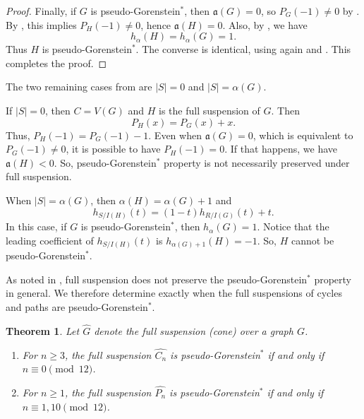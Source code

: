 \documentclass[12pt]{amsart}
\theoremstyle{plain}
\newtheorem{thm}{Theorem}[section]
\theoremstyle{definition}
\begin{document}
\begin{proof}
Finally, if \(G\) is pseudo-Gorenstein\(^{*}\), then \(\mathfrak a(G)=0\), so
\(P_G(-1)\neq 0\) by . By
, this implies \(P_H(-1)\neq 0\), hence
\(\mathfrak a(H)=0\). Also, by , we have
\[
h_{\alpha}(H)=h_{\alpha}(G)=1.
\]
Thus \(H\) is pseudo-Gorenstein\(^{*}\). The converse is identical, using again
 and . This completes
the proof.
\end{proof}


\begin{remark}\label{rem:susp_ver_cover_extreme_cases}
    The two remaining cases from  are $|S|=0$ and $|S|=\alpha(G)$.

    If $|S|=0$, then $C=V(G)$ and $H$ is the full suspension of $G$. Then 
    $$P_H(x)= P_G(x)+x.$$
    Thus, $P_H(-1)= P_G(-1)-1$. Even when $\mathfrak a(G)=0$, which is equivalent to $P_G(-1)\neq 0$, it is possible to have $P_H(-1)=0$. If that happens, we have $\mathfrak a(H)<0$.  So,  pseudo-Gorenstein\(^{*}\) property is not necessarily preserved under full suspension.  

    When $|S|=\alpha(G)$, then $\alpha(H)=\alpha(G)+1$ and 
    $$h_{S/I(H)} (t)= (1-t) h_{R/I(G)} (t) + t.$$
    In this case, if $G$ is  pseudo-Gorenstein\(^{*}\), then $h_{\alpha} (G)=1$. Notice that the leading coefficient of $h_{S/I(H)} (t)$ is $h_{\alpha(G)+1} (H)= -1$. So, $H$ cannot be pseudo-Gorenstein\(^{*}\).
\end{remark}



As noted in , full suspension does not
preserve the pseudo-Gorenstein\(^{*}\) property in general. We therefore
determine exactly when the full suspensions of cycles and paths are
pseudo-Gorenstein\(^{*}\).

\begin{thm}\label{thm:PGstar-full-susp-path-cycle}
Let \(\widehat{G}\) denote the \emph{full suspension} (cone) over a graph \(G\).
\begin{enumerate}
\item[(a)] For \(n\ge 3\), the full suspension \(\widehat{C_n}\) is pseudo-Gorenstein$^{*}$
if and only if \(n\equiv 0 \pmod{12}\).

\item[(b)] For \(n\ge 1\), the full suspension \(\widehat{P_n}\) is pseudo-Gorenstein$^{*}$
if and only if \(n\equiv 1,10 \pmod{12}\).
\end{enumerate}
\end{thm}
\end{document}
